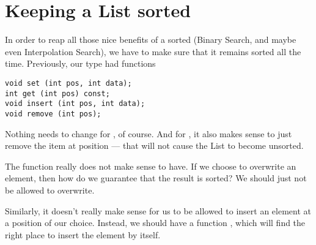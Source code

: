 \section{Keeping a List sorted}
In order to reap all those nice benefits of a sorted 
(Binary Search, and maybe even Interpolation Search), we have to make
sure that it remains sorted all the time. 
Previously, our  type had functions
\begin{verbatim}
void set (int pos, int data);
int get (int pos) const;
void insert (int pos, int data);
void remove (int pos);
\end{verbatim}

Nothing needs to change for , of course. 
And for , it also makes sense to just remove the item at
position  --- that will not cause the List to become
unsorted.

The function  really does not make sense to have. If we
choose to overwrite an element, then how do we guarantee that the
result is sorted? We should just not be allowed to overwrite.

Similarly, it doesn't really make sense for us to be allowed to insert
an element at a position of our choice. Instead, we should have a
function , which will find the
right place to insert the element by itself.

